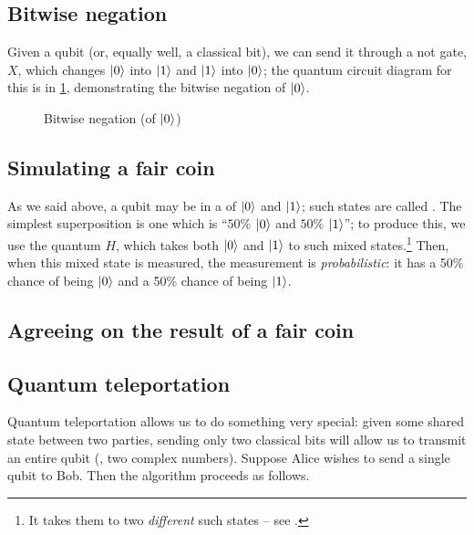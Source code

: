 \documentclass[12pt]{amsart}
\begin{document}
\subsection{Bitwise negation}\label{sec:bitwise-negation-hl}
Given a qubit (or, equally well, a classical bit), we can send it through a not
gate, $X$, which changes ${\left\vert{0}\right\rangle}$ into ${\left\vert{1}\right\rangle}$ and ${\left\vert{1}\right\rangle}$ into ${\left\vert{0}\right\rangle}$;
the quantum circuit diagram for this
is in \cref{fig:bitwise-negation}, demonstrating the bitwise negation of
${\left\vert{0}\right\rangle}$.

\begin{figure}
  \centerline{}
  \caption{Bitwise negation (of ${\left\vert{0}\right\rangle}$)}\label{fig:bitwise-negation}
\end{figure}

\subsection{Simulating a fair coin}\label{sec:fair-coin-hl}
As we said above, a qubit may be in a  of ${\left\vert{0}\right\rangle}$ and
${\left\vert{1}\right\rangle}$; such states are called .  The simplest
superposition is one which is ``$50\%$ ${\left\vert{0}\right\rangle}$ and $50\%$ ${\left\vert{1}\right\rangle}$''; to
produce this, we use the quantum  $H$, which takes both
${\left\vert{0}\right\rangle}$ and ${\left\vert{1}\right\rangle}$ to such mixed states.\footnote{It takes them to two
\emph{different} such states -- see .}  Then, when this
mixed state is measured, the measurement is \emph{probabilistic}: it has a 50\%
chance of being ${\left\vert{0}\right\rangle}$ and a 50\% chance of being ${\left\vert{1}\right\rangle}$.


\subsection{Agreeing on the result of a fair coin}\label{sec:agree-coin-hl}

\subsection{Quantum teleportation}\label{sec:teleportation-hl}
Quantum teleportation allows us to do something very special: given some shared
state between two parties, sending only two classical bits will allow us to
transmit an entire qubit (\IE, two complex numbers).  Suppose Alice wishes to
send a single qubit to Bob.  Then the algorithm proceeds as follows.
\end{document}
